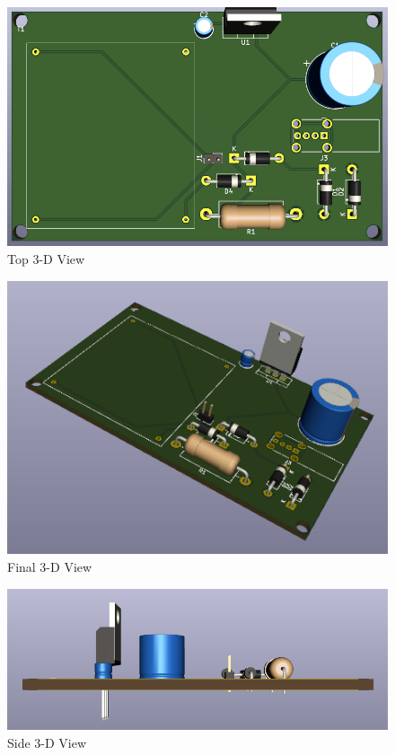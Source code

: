 \documentclass{article}
\begin{document}
\begin{figure}[h!]
\centerline{\includegraphics[scale=.6]{Images/a.png}}
\caption{Top 3-D View}
\label{figb}
\end{figure}
\begin{figure}[h!]
\centerline{\includegraphics[scale=.8]{Images/final3d.png}}
\caption{Final 3-D View}
\label{figb}
\end{figure}

\begin{figure}[h!]
\centerline{\includegraphics[scale=.6]{Images/c.png}}
\caption{Side 3-D View}
\label{figb}
\end{figure}
\end{document}
